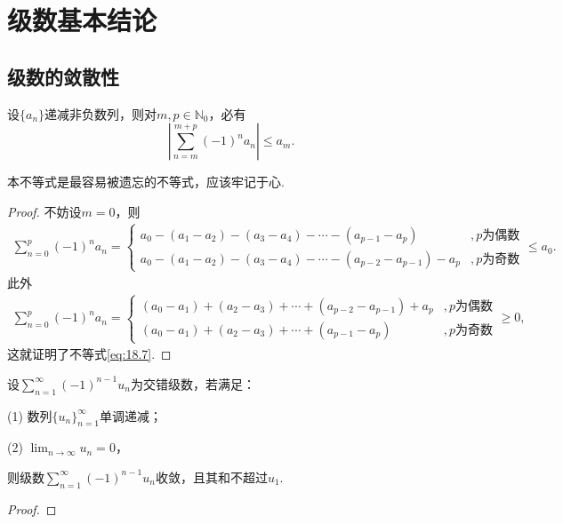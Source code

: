 \documentclass[../../main.tex]{subfiles}
\begin{document}
\section{级数基本结论}

\subsection{级数的敛散性}

\begin{theorem}[交错级数不等式]\label{theorem:交错级数不等式}
设\(\{a_n\}\)递减非负数列，则对\(m,p\in \mathbb{N}_0\)，必有
\begin{equation}\label{eq:18.7}
\left|\sum_{n = m}^{m + p} (-1)^n a_n\right| \leqslant a_m.
\end{equation}
\end{theorem}
\begin{note}
本不等式是最容易被遗忘的不等式，应该牢记于心.
\end{note}
\begin{proof}
不妨设\(m = 0\)，则
\begin{align*}
\sum_{n = 0}^{p} (-1)^n a_n = 
\begin{cases}
a_0 - (a_1 - a_2) - (a_3 - a_4) - \cdots - (a_{p - 1} - a_p) &, p\text{为偶数} \\
a_0 - (a_1 - a_2) - (a_3 - a_4) - \cdots - (a_{p - 2} - a_{p - 1}) - a_p &, p\text{为奇数}
\end{cases}
\leqslant a_0.
\end{align*}
此外
\begin{align*}
\sum_{n = 0}^{p} (-1)^n a_n = 
\begin{cases}
(a_0 - a_1) + (a_2 - a_3) + \cdots + (a_{p - 2} - a_{p - 1}) + a_p &, p\text{为偶数} \\
(a_0 - a_1) + (a_2 - a_3) + \cdots + (a_{p - 1} - a_p) &, p\text{为奇数}
\end{cases}
\geqslant 0,
\end{align*}
这就证明了不等式\eqref{eq:18.7}.
\end{proof}

\begin{theorem}\label{theorem:Leibniz(莱布尼兹)判别法}
设$\sum_{n=1}^{\infty} (-1)^{n - 1} u_n$为交错级数，若满足：

(1) 数列$\{u_n\}_{n=1}^{\infty}$单调递减；

(2) $\lim_{n \to \infty} u_n = 0$，

则级数$\sum_{n=1}^{\infty} (-1)^{n - 1} u_n$收敛，且其和不超过$u_1$.
\end{theorem}
\begin{proof}

\end{proof}
\end{document}
